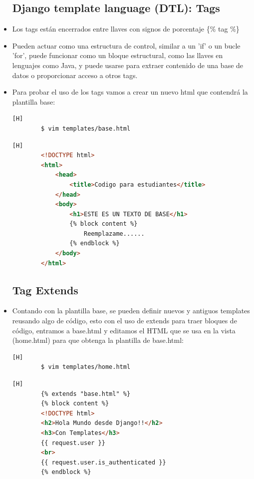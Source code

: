 \documentclass{article}
\begin{document}
\begin{itemize}
        \subsection{Django template language (DTL): Tags}
            \item Los tags están encerrados entre llaves con signos de porcentaje \{\% tag \%\}
            \item Pueden actuar como una estructura de control, similar a un 'if' o un bucle 'for', puede funcionar como un bloque estructural, como las llaves en lenguajes como Java, y puede usarse para extraer contenido de una base de datos o proporcionar acceso a otros tags.
            \item Para probar el uso de los tags vamos a crear un nuevo html que contendrá la plantilla base:
            
        \begin{lstlisting}[language=bash,caption={Creando la plantilla base.html}][H]
        $ vim templates/base.html
        \end{lstlisting}
        \begin{lstlisting}[language=HTML,caption={Incrustando tags block}][H]
        <!DOCTYPE html>
        <html>
            <head>
                <title>Codigo para estudiantes</title>
            </head>
            <body>
                <h1>ESTE ES UN TEXTO DE BASE</h1>
                {% block content %}
                    Reemplazame......
                {% endblock %}
            </body>
        </html>
        \end{lstlisting}

        \subsection{Tag Extends}
            \item Contando con la plantilla base, se pueden definir nuevos y antiguos templates reusando algo de código, esto con el uso de extends para traer bloques de código, entramos a base.html y editamos el HTML que se usa en la vista (home.html) para que obtenga la plantilla de base.html:
        \begin{lstlisting}[language=bash,caption={Ingresando a home.html}][H]
        $ vim templates/home.html
        \end{lstlisting}
        \begin{lstlisting}[language=HTML,caption={Incrustando tag extends a la plantilla de base}][H]
        {% extends "base.html" %}
        {% block content %}
        <!DOCTYPE html>
        <h2>Hola Mundo desde Django!!</h2>
        <h3>Con Templates</h3>
        {{ request.user }}
        <br>
        {{ request.user.is_authenticated }}
        {% endblock %}
        \end{lstlisting}


\end{itemize}
\end{document}
